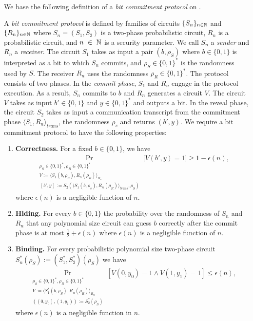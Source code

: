 We base the following definition of a \textit{bit commitment protocol} on \cite{LectureNotesComThCrypto}.
\begin{definition}
  \label{def:bit_commitment}
A \textit{bit commitment protocol} is defined by families of circuits $\{S_n\}_{n \in \mathbb{N}}$ and $\{R_n\}_{n \in \mathbb{N}}$
where $S_n = (S_1, S_2)$ is a two-phase probabilistic circuit, $R_n$ is a probabilistic circuit, and
$n~\in~\mathbb{N}$ is a security parameter. We call $S_n$ a \textit{sender} and $R_n$ a \textit{receiver}.
The circuit $S_1$ takes as input a pair $(b, \rho_S)$ where $b \in \{0,1\}$ is interpreted as a bit to which $S_n$ commits, and $\rho_S \in \{0,1\}^{*}$ is the randomness used by $S$.
The receiver $R_n$ uses the randomness $\rho_R \in \{0,1\}^{*}$.
The protocol consists of two phases. In the \textit{commit phase}, $S_1$ and $R_n$ engage in the protocol execution.
As a result, $S_n$ commits to $b$ and $R_n$ generates a circuit $V$.
The circuit $V$ takes as input $b' \in \{0,1\}$ and $y \in \{0,1\}^{*}$ and outputs a bit.
In the \textnormal{reveal phase}, the circuit $S_2$ takes as input a communication transcript from the commitment phase
$\langle S_1, R_n \rangle_{\mathit{trans}}$, the randomness $\rho_s$ and returns $(b', y)$.
We require a bit commitment protocol to have the following properties:
\begin{enumerate}[]
\item{\textnormal{\textbf{Correctness.}}} For a fixed $b \in \{0,1\}$, we have
  \begin{align*}
    \underset{\substack{\rho_S \in \{0,1\}^{*}, \rho_R \in \{0,1\}^{*} \\
        V := \langle S_1(b,\rho_S), R_n(\rho_R) \rangle_{R_n} \\
        (b',y) := S_2(\langle S_1(b,\rho_s), R_n(\rho_R) \rangle_{\mathit{trans}},\rho_S)}}{\Pr}\Big[V(b',y) = 1 \Big] \geq 1 - \epsilon(n),
  \end{align*}
where $\epsilon(n)$ is a negligible function of $n$.
\item{\textnormal{\textbf{Hiding.}}}
  For every $b \in \{0,1\}$ the probability over the randomness of $S_n$ and $R_n$ that any polynomial size circuit
  can guess $b$ correctly after the commit phase is at most $\frac{1}{2} + \epsilon(n)$ where $\epsilon(n)$ is a negligible function of $n$.
\item{\textnormal{\textbf{Binding.}}}
  For every probabilistic polynomial size two-phase circuit $S_n^*(\rho_S) := (S^*_1, S^*_2)(\rho_S)$ we have
  \begin{align*}
    \underset{\substack{
        \rho_S \in \{0,1\}^{*}, \rho_R \in \{0,1\}^{*} \\
        V := \langle S_1^*(b,\rho_S), R_n(\rho_R) \rangle_{R_n} \\ ((0, y_0), (1, y_1)) := S_2^*(\rho_S)}}{\Pr}[V(0,y_0) = 1 \land V(1,y_1) = 1] \leq \epsilon(n),
  \end{align*}
  where $\epsilon(n)$ is a negligible function in $n$.
\end{enumerate}
\end{definition}

